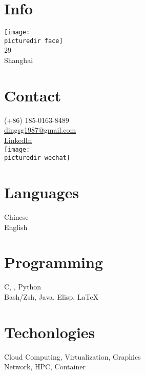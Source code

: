 \par\medskip
\section{Info}
\texttt{[image: \\picturedir face]}\\
29~\faMars\\
Shanghai~\faLocationArrow\\
\section{Contact}
(+86) 185-0163-8489~\faPhoneSquare\\
\href{mailto:dingsg1987@gmail.com}{dingsg1987@gmail.com}~\faEnvelopeSquare\\
\href{https://cn.linkedin.com/in/shengge-ding-9a844b36}{LinkedIn}~\faLinkedinSquare\\
\texttt{[image: \\picturedir wechat]}\\
\section{Languages}
Chinese~\faStar\\
English~\faStarHalfO\\
\section{Programming}
C, \CPP, Python~\faStar\\
Bash/Zsh, Java, Elisp, \LaTeX{}~\faStarHalfO\\
\section{Techonlogies}
Cloud Computing, Virtualization, Graphics~\faStar\\
Network, HPC, Container~\faStarHalfO\\
